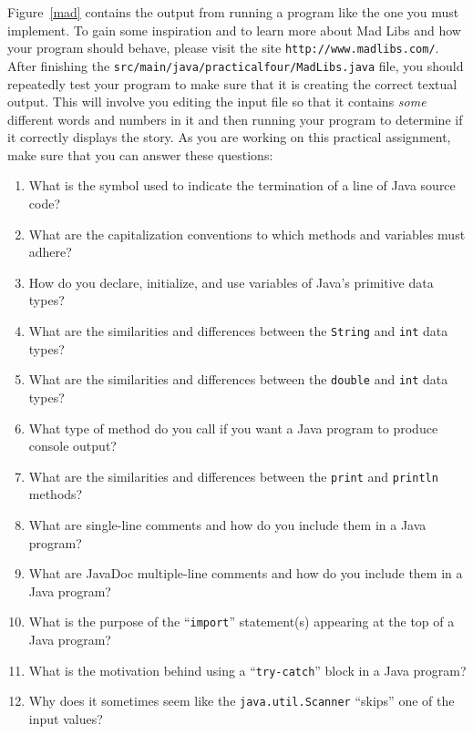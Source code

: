 \documentclass[11pt]{article}
\newcommand{\mainprogramsource}{\lstinline{src/main/java/practicalfour/MadLibs.java}}
\newcommand{\command}[1]{``\lstinline{#1}''}
\newcommand{\program}[1]{\lstinline{#1}}
\newcommand{\url}[1]{\lstinline{#1}}
\begin{document}
Figure~\ref{mad} contains the output from running a program like the one you
must implement. To gain some inspiration and to learn more about Mad Libs and
how your program should behave, please visit the site
\url{http://www.madlibs.com/}. After finishing the \mainprogramsource{} file,
you should repeatedly test your program to make sure that it is creating the
correct textual output. This will involve you editing the input file so that it
contains {\em some} different words and numbers in it and then running your
program to determine if it correctly displays the story. As you are working on
this practical assignment, make sure that you can answer these questions:

\begin{enumerate}
  \setlength{\itemsep}{2pt}

  \item What is the symbol used to indicate the termination of a line of Java source
    code?

  \item What are the capitalization conventions to which methods and
    variables must adhere?

  \item How do you declare, initialize, and use variables of Java's primitive
    data types?

  \item What are the similarities and differences between the \program{String} and
    {\tt int} data types?

  \item What are the similarities and differences between the \program{double}
    and {\tt int} data types?

  \item What type of method do you call if you want a Java program to produce
    console output?

  \item What are the similarities and differences between the \program{print}
    and \program{println} methods?

  \item What are single-line comments and how do you include them in a
    Java program?

  \item What are JavaDoc multiple-line comments and how do you include them in a
    Java program?

  \item What is the purpose of the \command{import} statement(s) appearing at
    the top of a Java program?

  \item What is the motivation behind using a \command{try-catch} block in a Java program?

  \item Why does it sometimes seem like the {\tt java.util.Scanner} ``skips''
    one of the input values?

\end{enumerate}
\end{document}
